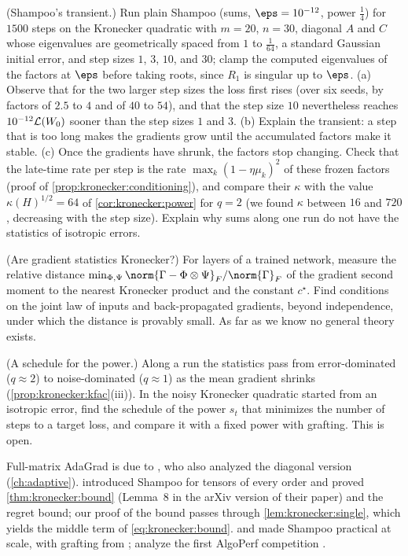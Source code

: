 \begin{refsection}
\begin{exercises}
\item \simulation (Shampoo's transient.) Run plain Shampoo (sums, $\eps=10^{-12}$, power $\frac14$) for $1500$ steps on the Kronecker quadratic with $m=20$, $n=30$, diagonal $A$ and $C$ whose eigenvalues are geometrically spaced from $1$ to $\frac1{64}$, a standard Gaussian initial error, and step sizes $1$, $3$, $10$, and $30$; clamp the computed eigenvalues of the factors at $\eps$ before taking roots, since $R_1$ is singular up to $\eps$. (a) Observe that for the two larger step sizes the loss first rises (over six seeds, by factors of $2.5$ to $4$ and of $40$ to $54$), and that the step size $10$ nevertheless reaches $10^{-12}\mathcal{L}(W_0)$ sooner than the step sizes $1$ and $3$. (b) Explain the transient: a step that is too long makes the gradients grow until the accumulated factors make it stable. (c) Once the gradients have shrunk, the factors stop changing. Check that the late-time rate per step is the rate $\max_k(1-\eta\mu_k)^2$ of these frozen factors (proof of \cref{prop:kronecker:conditioning}), and compare their $\kappa$ with the value $\kappa(H)^{1/2}=64$ of \cref{cor:kronecker:power} for $q=2$ (we found $\kappa$ between $16$ and $720$, decreasing with the step size). Explain why sums along one run do not have the statistics of isotropic errors.\label{ex:kronecker:transient}

\item \research (Are gradient statistics Kronecker?) For layers of a trained network, measure the relative distance $\min_{\Phi,\Psi}\norm{\Gamma-\Phi\otimes\Psi}_F/\norm{\Gamma}_F$ of the gradient second moment to the nearest Kronecker product \parencite{VanLoanPitsianis1993} and the constant $c^\star$. Find conditions on the joint law of inputs and back-propagated gradients, beyond independence, under which the distance is provably small. As far as we know no general theory exists.\label{ex:kronecker:kron}

\item \research (A schedule for the power.) Along a run the statistics pass from error-dominated ($q\approx2$) to noise-dominated ($q\approx1$) as the mean gradient shrinks (\cref{prop:kronecker:kfac}(iii)). In the noisy Kronecker quadratic started from an isotropic error, find the schedule of the power $s_t$ that minimizes the number of steps to a target loss, and compare it with a fixed power with grafting. This is open.\label{ex:kronecker:schedule}
\end{exercises}

\notesandrefs
Full-matrix AdaGrad is due to \textcite{DuchiHazanSinger2011}, who also analyzed the diagonal version (\cref{ch:adaptive}). \Textcite{GuptaKorenSinger2018} introduced Shampoo for tensors of every order and proved \cref{thm:kronecker:bound} (Lemma~8 in the arXiv version of their paper) and the regret bound; our proof of the bound passes through \cref{lem:kronecker:single}, which yields the middle term of \eqref{eq:kronecker:bound}. \Textcite{AnilEtAl2020} and \textcite{ShiEtAl2023} made Shampoo practical at scale, with grafting from \textcite{AgarwalEtAl2020Grafting}; \textcite{KasimbegEtAl2025} analyze the first AlgoPerf competition \parencite{DahlEtAl2023}.


\end{refsection}
